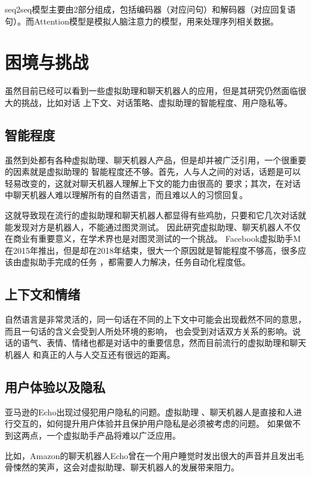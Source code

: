 \documentclass[UTF8]{ctexart}
\begin{document}
seq2seq模型主要由2部分组成，包括编码器（对应问句）和解码器（对应回复语句）。而Attention模型是模拟人脑注意力的模型，用来处理序列相关数据。
\cite{简治平2019基于}


\section{困境与挑战}

虽然目前已经可以看到一些虚拟助理和聊天机器人的应用，但是其研究仍然面临很大的挑战，比如对话
上下文、对话策略、虚拟助理的智能程度、用户隐私等。

\subsection{智能程度}

虽然到处都有各种虚拟助理、聊天机器人产品，但是却并被广泛引用，一个很重要的因素就是虚拟助理的
智能程度还不够。首先，人与人之间的对话，话题是可以轻易改变的，这就对聊天机器人理解上下文的能力由很高的
要求；其次，在对话中聊天机器人难以理解所有的自然语言，而且难以人的习惯回复。

这就导致现在流行的虚拟助理和聊天机器人都显得有些鸡肋，只要和它几次对话就能发现对方是机器人，不能通过图灵测试。
因此研究虚拟助理、聊天机器人不仅在商业有重要意义，在学术界也是对图灵测试的一个挑战。
Facebook虚拟助手M在2015年推出，但是却在2018年结束，很大一个原因就是智能程度不够高，很多应该由虚拟助手完成的任务
，都需要人力解决，任务自动化程度低。

\subsection{上下文和情绪}

自然语言是非常灵活的，同一句话在不同的上下文中可能会出现截然不同的意思，而且一句话的含义会受到人所处环境的影响，
也会受到对话双方关系的影响。说话的语气、表情、情绪也都是对话中的重要信息，然而目前流行的虚拟助理和聊天机器人
和真正的人与人交互还有很远的距离。

\subsection{用户体验以及隐私}

亚马逊的Echo出现过侵犯用户隐私的问题。虚拟助理
、聊天机器人是直接和人进行交互的，如何提升用户体验并且保护用户隐私是必须被考虑的问题。
如果做不到这两点，一个虚拟助手产品将难以广泛应用。

比如，Amazon的聊天机器人Echo曾在一个用户睡觉时发出很大的声音并且发出毛骨悚然的笑声，这会对虚拟助理、聊天机器人的发展带来阻力。
\end{document}
